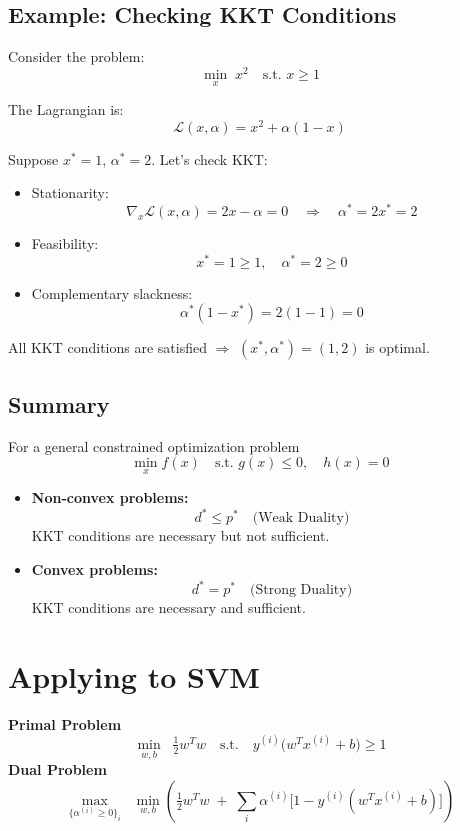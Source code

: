 \documentclass[11pt]{article}
\begin{document}
\subsection*{Example: Checking KKT Conditions}

Consider the problem:
\[
\min_x \; x^2 \quad \text{s.t. } x \geq 1
\]

The Lagrangian is:
\[
\mathcal{L}(x, \alpha) = x^2 + \alpha (1 - x)
\]

Suppose $x^* = 1$, $\alpha^* = 2$. Let’s check KKT:

\begin{itemize}
    \item Stationarity: 
    \[
    \nabla_x \mathcal{L}(x, \alpha) = 2x - \alpha = 0 
    \quad \Rightarrow \quad \alpha^* = 2x^* = 2
    \]
    \item Feasibility: 
    \[
    x^* = 1 \geq 1, \quad \alpha^* = 2 \geq 0
    \]
    \item Complementary slackness: 
    \[
    \alpha^* (1 - x^*) = 2(1 - 1) = 0
    \]
\end{itemize}

All KKT conditions are satisfied $\Rightarrow$ $(x^*, \alpha^*) = (1,2)$ is optimal.

\subsection	*{Summary}

For a general constrained optimization problem
\[
\min_{x} f(x) \quad \text{s.t. } g(x) \leq 0, \quad h(x) = 0
\]

\begin{itemize}
    \item \textbf{Non-convex problems:}
    \[
    d^* \leq p^* \quad \text{(Weak Duality)}
    \]
    KKT conditions are necessary but not sufficient.

    \item \textbf{Convex problems:}
    \[
    d^* = p^* \quad \text{(Strong Duality)}
    \]
    KKT conditions are necessary and sufficient.
\end{itemize}

\section*{Applying to SVM}

\textbf{Primal Problem}
\[
\min_{w,b} \;\; \tfrac{1}{2} w^T w 
\quad \text{s.t.} \quad 
y^{(i)} \big(w^T x^{(i)} + b \big) \geq 1
\]
\textbf{Dual Problem}
\[
\max_{\{\alpha^{(i)} \geq 0\}_i} 
\;\; \min_{w,b} \left( 
\tfrac{1}{2} w^T w \;+\; 
\sum_i \alpha^{(i)} \Big[1 - y^{(i)} (w^T x^{(i)} + b) \Big] 
\right)
\]
\end{document}
